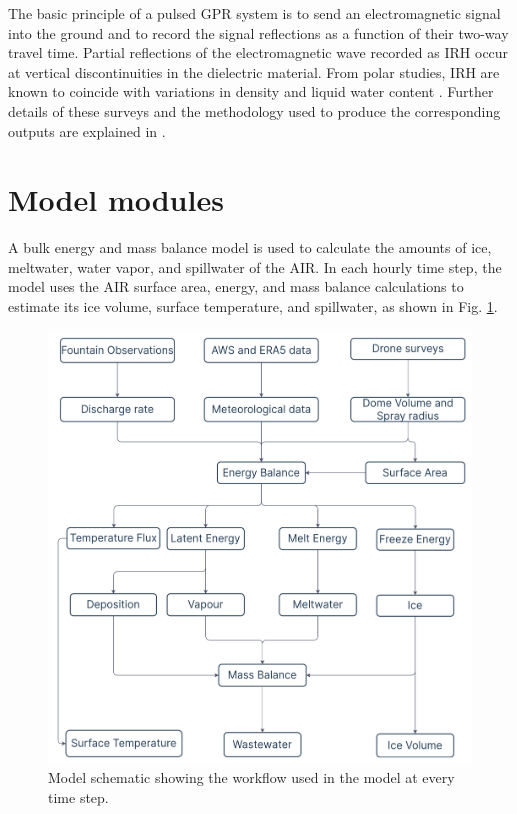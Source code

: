 The basic principle of a pulsed \ac{GPR} system is to send an electromagnetic signal into the ground and to
record the signal reflections as a function of their two-way travel time. Partial reflections of the
electromagnetic wave recorded as \ac{IRH} occur at vertical discontinuities in the dielectric material. From
polar studies, \ac{IRH} are known to coincide with variations in density and liquid water content
\citep{forster2014extensive}. Further details of these surveys and the methodology used to produce the
corresponding outputs are explained in \citet{balasubramanian_suryanarayanan_2022_7056646}.



\section{Model modules}
\label{sec:modules}

A bulk energy and mass balance model is used to calculate the amounts of ice, meltwater, water vapor, and
spillwater of the \ac{AIR}. In each hourly time step, the model uses the \ac{AIR} surface area, energy, and mass balance
calculations to estimate its ice volume, surface temperature, and spillwater, as shown in Fig. \ref{fig:schema}.

\begin{figure}
	\begin{center}
		\includegraphics[width=10 cm]{figs/model_schematic.jpg}
	\end{center}
	\caption{Model schematic showing the workflow used in the model at every time step. }
	\label{fig:schema}
\end{figure}

